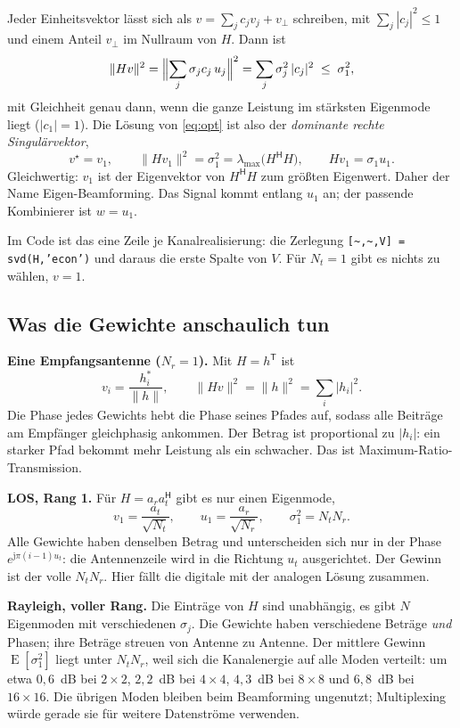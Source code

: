 \documentclass[11pt,a4paper]{article}
\newcommand{\E}{\operatorname{E}}
\newcommand{\file}[1]{\texttt{#1}}
\begin{document}
Jeder Einheitsvektor lässt sich als $v=\sum_jc_jv_j+v_\perp$ schreiben, mit
$\sum_j|c_j|^2\le1$ und einem Anteil $v_\perp$ im Nullraum von $H$. Dann ist
\begin{equation}
\|Hv\|^2=\Bigl\|\sum_j\sigma_jc_j\,u_j\Bigr\|^2=\sum_j\sigma_j^2\,|c_j|^2\;\le\;\sigma_1^2 ,
\end{equation}
mit Gleichheit genau dann, wenn die ganze Leistung im stärksten Eigenmode liegt
($|c_1|=1$). Die Lösung von \eqref{eq:opt} ist also der \emph{dominante rechte Singulärvektor},
\begin{equation}
v^\star=v_1,\qquad \|Hv_1\|^2=\sigma_1^2=\lambda_{\max}\bigl(H^{\mathsf H}H\bigr),\qquad Hv_1=\sigma_1u_1 .
\end{equation}
Gleichwertig: $v_1$ ist der Eigenvektor von $H^{\mathsf H}H$ zum größten Eigenwert. Daher der Name
Eigen-Beamforming. Das Signal kommt entlang $u_1$ an; der passende Kombinierer ist $w=u_1$.

Im Code ist das eine Zeile je Kanalrealisierung: die Zerlegung \file{[\textasciitilde,\textasciitilde,V] = svd(H,'econ')}
und daraus die erste Spalte von $V$. Für $N_t=1$ gibt es nichts zu wählen, $v=1$.

\subsection{Was die Gewichte anschaulich tun}

\textbf{Eine Empfangsantenne ($N_r=1$).} Mit $H=h^{\mathsf T}$ ist
\begin{equation}
v_i=\frac{h_i^\ast}{\|h\|},\qquad \|Hv\|^2=\|h\|^2=\sum_i|h_i|^2 .
\end{equation}
Die Phase jedes Gewichts hebt die Phase seines Pfades auf, sodass alle Beiträge am Empfänger
gleichphasig ankommen. Der Betrag ist proportional zu $|h_i|$: ein starker Pfad bekommt mehr
Leistung als ein schwacher. Das ist Maximum-Ratio-Transmission.

\textbf{LOS, Rang 1.} Für $H=a_ra_t^{\mathsf H}$ gibt es nur einen Eigenmode,
\begin{equation}
v_1=\frac{a_t}{\sqrt{N_t}},\qquad u_1=\frac{a_r}{\sqrt{N_r}},\qquad \sigma_1^2=N_tN_r .
\end{equation}
Alle Gewichte haben denselben Betrag und unterscheiden sich nur in der Phase
$e^{\mathrm j\pi(i-1)u_t}$: die Antennenzeile wird in die Richtung $u_t$ ausgerichtet. Der Gewinn ist
der volle $N_tN_r$. Hier fällt die digitale mit der analogen Lösung zusammen.

\textbf{Rayleigh, voller Rang.} Die Einträge von $H$ sind unabhängig, es gibt $N$ Eigenmoden mit
verschiedenen $\sigma_j$. Die Gewichte haben verschiedene Beträge \emph{und} Phasen; ihre Beträge
streuen von Antenne zu Antenne. Der mittlere Gewinn $\E[\sigma_1^2]$ liegt unter $N_tN_r$, weil
sich die Kanalenergie auf alle Moden verteilt: um etwa $0{,}6$~dB bei $2\times2$, $2{,}2$~dB bei
$4\times4$, $4{,}3$~dB bei $8\times8$ und $6{,}8$~dB bei $16\times16$. Die übrigen Moden bleiben beim
Beamforming ungenutzt; Multiplexing würde gerade sie für weitere Datenströme verwenden.
\end{document}
